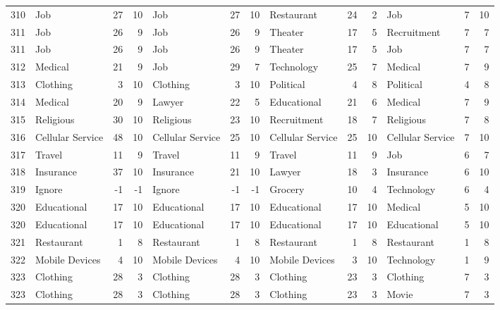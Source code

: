 \begin{figure}[htbp]
\begin{tabular}{rlrrlrrlrrlrr}
    310   & Job   & 27    & 10    & Job   & 27    & 10    & Restaurant & 24    & 2     & Job   & 7     & 10 \\
    311   & Job   & 26    & 9     & Job   & 26    & 9     & Theater & 17    & 5     & Recruitment & 7     & 7 \\
    311   & Job   & 26    & 9     & Job   & 26    & 9     & Theater & 17    & 5     & Job   & 7     & 7 \\
    312   & Medical & 21    & 9     & Job   & 29    & 7     & Technology & 25    & 7     & Medical & 7     & 9 \\
    313   & Clothing & 3     & 10    & Clothing & 3     & 10    & Political & 4     & 8     & Political & 4     & 8 \\
    314   & Medical & 20    & 9     & Lawyer & 22    & 5     & Educational & 21    & 6     & Medical & 7     & 9 \\
    315   & Religious & 30    & 10    & Religious & 23    & 10    & Recruitment & 18    & 7     & Religious & 7     & 8 \\
    316   & Cellular Service & 48    & 10    & Cellular Service & 25    & 10    & Cellular Service & 25    & 10    & Cellular Service & 7     & 10 \\
    317   & Travel & 11    & 9     & Travel & 11    & 9     & Travel & 11    & 9     & Job   & 6     & 7 \\
    318   & Insurance & 37    & 10    & Insurance & 21    & 10    & Lawyer & 18    & 3     & Insurance & 6     & 10 \\
    319   & Ignore & -1    & -1    & Ignore & -1    & -1    & Grocery & 10    & 4     & Technology & 6     & 4 \\
    320   & Educational & 17    & 10    & Educational & 17    & 10    & Educational & 17    & 10    & Medical & 5     & 10 \\
    320   & Educational & 17    & 10    & Educational & 17    & 10    & Educational & 17    & 10    & Educational & 5     & 10 \\
    321   & Restaurant & 1     & 8     & Restaurant & 1     & 8     & Restaurant & 1     & 8     & Restaurant & 1     & 8 \\
    322   & Mobile Devices & 4     & 10    & Mobile Devices & 4     & 10    & Mobile Devices & 3     & 10    & Technology & 1     & 9 \\
    323   & Clothing & 28    & 3     & Clothing & 28    & 3     & Clothing & 23    & 3     & Clothing & 7     & 3 \\
    323   & Clothing & 28    & 3     & Clothing & 28    & 3     & Clothing & 23    & 3     & Movie & 7     & 3 \\

\end{tabular}
\end{figure}
